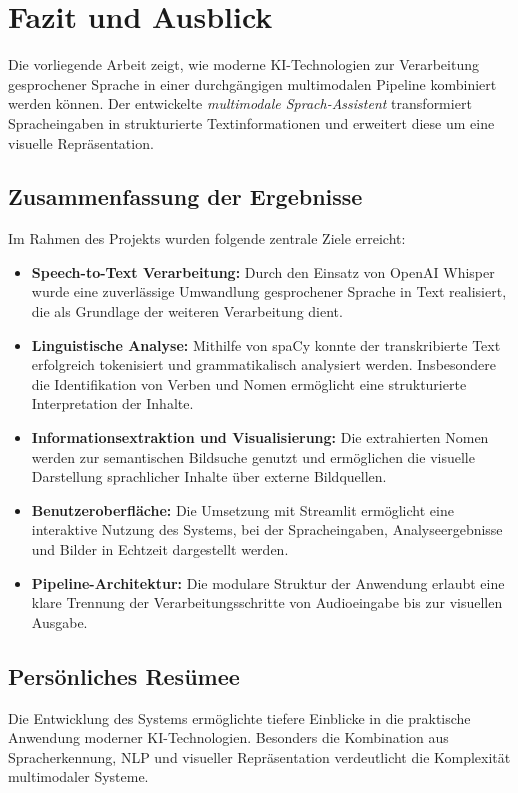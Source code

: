\chapter{Fazit und Ausblick}
\label{sec:fazit}

Die vorliegende Arbeit zeigt, wie moderne KI-Technologien zur Verarbeitung gesprochener Sprache in einer durchgängigen multimodalen Pipeline kombiniert werden können. Der entwickelte \textit{multimodale Sprach-Assistent} transformiert Spracheingaben in strukturierte Textinformationen und erweitert diese um eine visuelle Repräsentation.

\section{Zusammenfassung der Ergebnisse}
Im Rahmen des Projekts wurden folgende zentrale Ziele erreicht:

\begin{itemize}
    \item \textbf{Speech-to-Text Verarbeitung:} Durch den Einsatz von OpenAI Whisper wurde eine zuverlässige Umwandlung gesprochener Sprache in Text realisiert, die als Grundlage der weiteren Verarbeitung dient.

    \item \textbf{Linguistische Analyse:} Mithilfe von spaCy konnte der transkribierte Text erfolgreich tokenisiert und grammatikalisch analysiert werden. Insbesondere die Identifikation von Verben und Nomen ermöglicht eine strukturierte Interpretation der Inhalte.

    \item \textbf{Informationsextraktion und Visualisierung:} Die extrahierten Nomen werden zur semantischen Bildsuche genutzt und ermöglichen die visuelle Darstellung sprachlicher Inhalte über externe Bildquellen.

    \item \textbf{Benutzeroberfläche:} Die Umsetzung mit Streamlit ermöglicht eine interaktive Nutzung des Systems, bei der Spracheingaben, Analyseergebnisse und Bilder in Echtzeit dargestellt werden.

    \item \textbf{Pipeline-Architektur:} Die modulare Struktur der Anwendung erlaubt eine klare Trennung der Verarbeitungsschritte von Audioeingabe bis zur visuellen Ausgabe.
\end{itemize}

\section{Persönliches Resümee}
Die Entwicklung des Systems ermöglichte tiefere Einblicke in die praktische Anwendung moderner KI-Technologien. Besonders die Kombination aus Spracherkennung, NLP und visueller Repräsentation verdeutlicht die Komplexität multimodaler Systeme.


